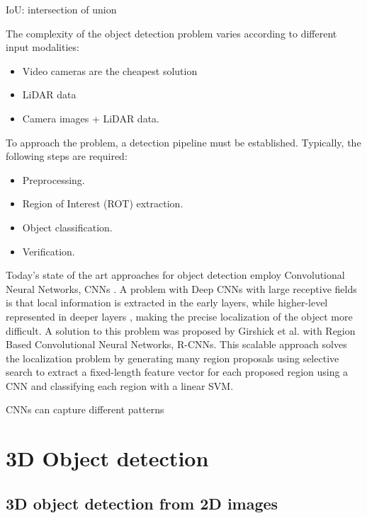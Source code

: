 IoU: intersection of union

The complexity of the object detection problem varies according to different input modalities:
\begin{itemize}
    \item Video cameras are the cheapest solution
    \item LiDAR data 
    \item Camera images + LiDAR data. 
\end{itemize}

To approach the problem, a detection pipeline must be established. Typically, the following steps are required:
\begin{itemize}
    \item Preprocessing.
    \item Region of Interest (ROT) extraction.
    \item Object classification.
    \item Verification.
\end{itemize}

Today's state of the art approaches for object detection employ Convolutional Neural Networks, CNNs \cite{DBLP:conf/eccv/CaiFFV16} \cite{DBLP:journals/pami/ChenKZMFU18}.
A problem with Deep CNNs with large receptive fields is that local information is extracted in the early layers, while higher-level represented in deeper layers \cite{DBLP:journals/ftcgv/JanaiGBG20}, making the precise localization of the object more difficult.
A solution to this problem was proposed by Girshick et al. \cite{DBLP:conf/cvpr/GirshickDDM14} with Region Based Convolutional Neural Networks, R-CNNs. This scalable approach solves the localization problem by generating many region proposals using selective search \cite{DBLP:journals/ijcv/UijlingsSGS13} to extract a fixed-length feature vector for each proposed region using a CNN and classifying each region with a linear SVM.




CNNs can capture different patterns 


\newpage
\section{3D Object detection}

\subsection{3D object detection from 2D images}

